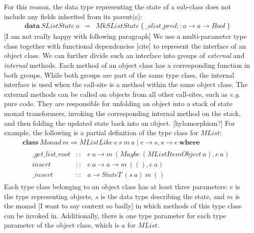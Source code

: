 \documentclass[runningheads,a4paper]{llncs}
\newcommand{\todo}[1]{[{\color{blue}#1}]}
\begin{document}
For this reason, the data type representing the state of a sub-class does not include any fields inherited from its parent(s):
\begin{displaymath}
\begin{array}{lcl}
\mathbf{data}~\mathit{SListState}~a & = & \mathit{MkSListState}~\{~ \_ slist \_ pred :: a \to a \to \mathit{Bool}~\}
\end{array}
\end{displaymath}
\todo{I am not really happy with following paragraph}
We use a multi-parameter type class together with functional dependencies \todo{cite} to represent the interface of an object class. We can further divide such an interface into groups of \emph{external} and \emph{internal} methods. Each method of an object class has a corresponding function in both groups. While both groups are part of the same type class, the internal interface is used when the call-site is a method within the same object class. The external methods can be called on objects from all other call-sites, such as \emph{e.g.} pure code. They are responsible for unfolding an object into a stack of state monad transformers, invoking the corresponding internal method on the stack, and then folding the updated state back into an object. \todo{hylomorphism?} For example, the following is a partial definition of the type class for $\mathit{MList}$: 
\begin{displaymath}
\begin{array}{l}
\mathbf{class}~\mathit{Monad}~m \Rightarrow \mathit{MListLike}~e~s~m~a \mid e \to s, s \to e~\mathbf{where} \\
\quad \begin{array}{lcl}
\mathit{\_ \mathit{get}\_\mathit{list}\_\mathit{root}} & :: & e~a \to m~(\mathit{Maybe}~(\mathit{MListItemObject~a}),e~a) \\
\mathit{insert} & :: & e~a \to a \to m~((),e~a) \\
\_\mathit{insert} & :: & a \to \mathit{StateT}~(s~a)~m~()
\end{array}
\end{array}
\end{displaymath}
Each type class belonging to an object class has at least three parameters: $e$ is the type representing objects, $s$ is the data type describing the state, and $m$ is the monad \todo{I want to say context so badly} in which methods of this type class can be invoked in. Additionally, there is one type parameter for each type parameter of the object class, which is $a$ for $\mathit{MList}$.
\end{document}
